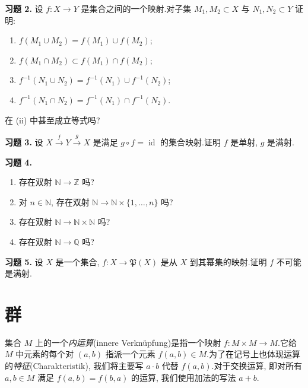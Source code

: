 \medskip
\noindent\textbf{习题 2.} 设 $f \colon X \longrightarrow Y$ 是集合之间的一个映射.对子集 $M_1, M_2 \subset X$ 与 $N_1, N_2 \subset Y$ 证明:
\begin{enumerate}
\item[(i)] $f(M_1 \cup M_2) = f(M_1) \cup f(M_2)$;
\item[(ii)] $f(M_1 \cap M_2) \subset f(M_1) \cap f(M_2)$;
\item[(iii)] $f^{-1}(N_1 \cup N_2) = f^{-1}(N_1) \cup f^{-1}(N_2)$;
\item[(iv)] $f^{-1}(N_1 \cap N_2) = f^{-1}(N_1) \cap f^{-1}(N_2)$.
\end{enumerate}
在 (ii) 中甚至成立等式吗?

\medskip
\noindent\textbf{习题 3.} 设 $X \xrightarrow{\ f\ } Y \xrightarrow{\ g\ } X$ 是满足 $g \circ f = \operatorname{id}$ 的集合映射.证明 $f$ 是单射, $g$ 是满射.

\medskip
\noindent\textbf{习题 4.}
\begin{enumerate}
\item[(i)] 存在双射 $\mathbb{N} \longrightarrow \mathbb{Z}$ 吗?
\item[(ii)] 对 $n \in \mathbb{N}$, 存在双射 $\mathbb{N} \longrightarrow \mathbb{N} \times \{1, \ldots, n\}$ 吗?
\item[(iii)] 存在双射 $\mathbb{N} \longrightarrow \mathbb{N} \times \mathbb{N}$ 吗?
\item[(iv)] 存在双射 $\mathbb{N} \longrightarrow \mathbb{Q}$ 吗?
\end{enumerate}

\medskip
\noindent\textbf{习题 5.} 设 $X$ 是一个集合, $f \colon X \longrightarrow \mathfrak{P}(X)$ 是从 $X$ 到其幂集的映射.证明 $f$ 不可能是满射.

\section{群}\label{sec:1.2}

集合 $M$ 上的一个\emph{内运算}(\textup{innere Verknüpfung})是指一个映射 $f \colon M \times M \longrightarrow M$.它给 $M$ 中元素的每个对 $(a, b)$ 指派一个元素 $f(a, b) \in M$.为了在记号上也体现运算的\emph{特征}(\textup{Charakteristik}), 我们将主要写 $a \cdot b$ 代替 $f(a, b)$.对于交换运算, 即对所有 $a, b \in M$ 满足 $f(a, b) = f(b, a)$ 的运算, 我们使用加法的写法 $a + b$.

